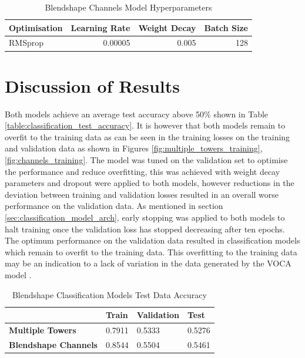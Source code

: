 \begin{table}[h!]
\centering
    \begin{tabular}{l | r | r | r}
    \textbf{Optimisation} & \textbf{Learning Rate} & \textbf{Weight Decay} & \textbf{Batch Size} \\
    \hline
    RMSprop & 0.00005 & 0.005 & 128 \\
    \end{tabular} 
    \caption{Blendshape Channels Model Hyperparameters}
\end{table}\label{table:blendshape_channels_classifier_hyperparameters}

\section{Discussion of Results}
Both models achieve an average test accuracy above 50\% shown in Table \ref{table:classification_test_accuracy}.
It is however that both models remain to overfit to the training data as can be seen in the training losses on the training and validation data as shown in Figures \ref{fig:multiple_towers_training}, \ref{fig:channels_training}.
The model was tuned on the validation set to optimise the performance and reduce overfitting, this was achieved with weight decay parameters and dropout were applied to both models, however reductions in the deviation between training and validation losses resulted in an overall worse performance on the validation data.
As mentioned in section \ref{sec:classification_model_arch}, early stopping was applied to both models to halt training once the validation loss has stopped decreasing after ten epochs.
The optimum performance on the validation data resulted in classification models which remain to overfit to the training data.
This overfitting to the training data may be an indication to a lack of variation in the data generated by the VOCA model \cite{Cudeiro2019}.

\begin{table}[h!]
\centering
    \begin{tabular}{l | l | l | l }
    & \textbf{Train} & \textbf{Validation} & \textbf{Test} \\ \hline
    \textbf{Multiple Towers} & 0.7911 & 0.5333 & 0.5276 \\
    \textbf{Blendshape Channels} & 0.8544 & 0.5504 & 0.5461 \\
    \end{tabular} 
    \caption{Blendshape Classification Models Test Data Accuracy}
\end{table}\label{table:classification_test_accuracy}

